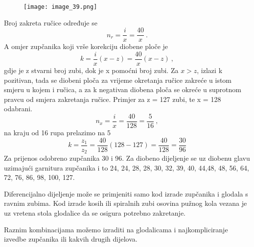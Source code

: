\documentclass[a4paper,12pt]{article}
\numberwithin{figure}{section}
\begin{document}
\begin{figure}[!h]
\centering
\texttt{[image: image\_39.png]}
\end{figure}
\FloatBarrier
\noindent Broj zakreta ručice određuje se
\begin{equation}
n_{r} = \frac{i}{x} = \frac{40}{x}\:.
\end{equation}
A omjer zupčanika koji vrše korekciju diobene ploče je
\begin{equation}
k = \frac{i}{x}(x-z) = \frac{40}{x}(x-z)\:,
\end{equation}
gdje je z stvarni broj zubi, dok je x pomoćni broj zubi. Za $x>z$, izlazi k pozitivan, tada se diobeni ploča za vrijeme okretanja ručice zakreće u istom smjeru u kojem i ručica, a za k negativan diobena ploča se okreće u suprotnom pravcu od smjera zakretanja ručice.
Primjer za z = 127 zubi, te x = 128 odabrani.
\begin{equation}
n_{x} = \frac{i}{x} = \frac{40}{128} = \frac{5}{16}\:,
\end{equation} 
na kraju od 16 rupa prelazimo na 5
\begin{equation}
k = \frac{z_{1}}{z_{2}} = \frac{40}{128} (128-127) = \frac{40}{128} = \frac{30}{96}
\end{equation}
Za prijenos odobreno zupčanika 30 i 96. Za diobeno dijeljenje se uz diobenu glavu uzimajući garnitura zupčanika i to 24, 24, 28, 28, 30, 32, 39, 40, 44,48, 48, 56, 64, 72, 76, 86, 98, 100, 127.\par
Diferencijalno dijeljenje može se primjeniti samo kod izrade zupčanika i glodala s ravnim zubima. Kod izrade kosih ili spiralnih zubi osovina pužnog kola vezana je uz vretena stola glodalice da se osigura potrebno zakretanje.\par
Raznim kombinacijama možemo izraditi na glodalicama i najkompliciranje izvedbe zupčanika ili kakvih drugih dijelova.
\end{document}

